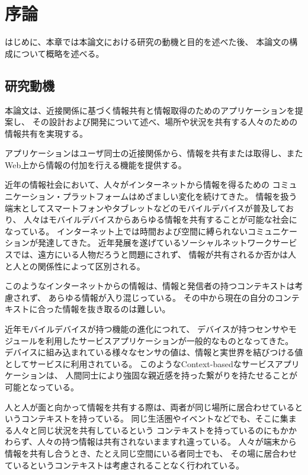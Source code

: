 \chapter{序論}\label{chap:introduction}

はじめに、本章では本論文における研究の動機と目的を述べた後、
本論文の構成について概略を述べる。

\newpage

\section{研究動機}

本論文は、近接関係に基づく情報共有と情報取得のためのアプリケーションを提案し、
その設計および開発について述べ、場所や状況を共有する人々のための情報共有を実現する。

アプリケーションはユーザ同士の近接関係から、情報を共有または取得し、またWeb上から情報の付加を行える機能を提供する。

近年の情報社会において、人々がインターネットから情報を得るための
コミュニケーション・プラットフォームはめざましい変化を続けてきた。
情報を扱う端末としてスマートフォンやタブレットなどのモバイルデバイスが普及しており、
人々はモバイルデバイスからあらゆる情報を共有することが可能な社会になっている。
インターネット上では時間および空間に縛られないコミュニケーションが発達してきた。
近年発展を遂げているソーシャルネットワークサービスでは、遠方にいる人物だろうと問題にされず、
情報が共有されるか否かは人と人との関係性によって区別される。

このようなインターネットからの情報は、情報と発信者の持つコンテキストは考慮されず、
あらゆる情報が入り混じっている。
その中から現在の自分のコンテキストに合った情報を抜き取るのは難しい。

近年モバイルデバイスが持つ機能の進化につれて、
デバイスが持つセンサやモジュールを利用したサービスアプリケーションが一般的なものとなってきた。
デバイスに組み込まれている様々なセンサの値は、情報と実世界を結びつける値としてサービスに利用されている。
このようなContext-basedなサービスアプリケーションは、
人間同士により強固な親近感を持った繋がりを持たせることが可能となっている。

人と人が面と向かって情報を共有する際は、両者が同じ場所に居合わせているというコンテキストを持っている。
同じ生活圏やイベントなどでも、そこに集まる人々と同じ状況を共有しているという
コンテキストを持っているのにもかかわらず、人々の持つ情報は共有されないまますれ違っている。
人々が端末から情報を共有し合うとき、たとえ同じ空間にいる者同士でも、
その場に居合わせているというコンテキストは考慮されることなく行われている。

